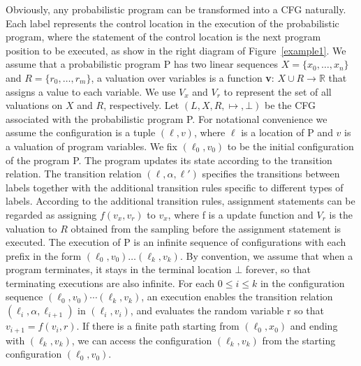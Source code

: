 \documentclass[runningheads]{llncs}
\newcommand\yx[1]{{\color{red} [YD: #1]}}
\begin{document}
Obviously, any probabilistic program can be transformed into a CFG naturally. Each label represents the control location in the execution of the probabilistic program, where the statement of the control location is the next program position to be executed, as show in the right diagram of Figure~\ref{example1}. 
We assume that a probabilistic program P has two linear sequences $X=\{x_0,\dots,x_{n}\}$ and $R=\{r_0,\dots,r_{m}\}$, a valuation over variables is a function \textbf{v}: $X\cup R \to \mathbb{R}$ that assigns a value to each variable. We use $V_x$ and $V_r$ to represent the set of all valuations on $X$ and $R$, respectively. 
Let $(L,X,R,\mapsto,\bot)$ be the CFG associated with the probabilistic program P. For notational convenience we assume the configuration is a tuple $(\ell, v)$, where $\ell$ is a location of P and $v$ is a valuation of program variables.
We fix $(\ell_0, v_0)$ to be the initial configuration of the program P. The program updates its state according to the transition relation. The transition relation $(\ell,\alpha,\ell')$ specifies the transitions between labels together with the additional transition rules specific to different types of labels.
According to the additional transition rules, assignment statements can be regarded as assigning $f(v_x,v_r)$ to $v_x$, where f is a update function and $V_r$ is the valuation to $R$ obtained from the sampling before the assignment statement is executed.
The execution of P is an infinite
sequence of configurations with each prefix in the form $(\ell_0, v_0) \dots (\ell_k, v_k)$. By convention, we assume that when a program terminates, it stays in the terminal location $\bot$ forever, so that terminating executions are also infinite. %
For each $0\leq i\leq k$ in the configuration sequence $(\ell_0,v_0) \cdots (\ell_k, v_k)$, an execution enables the transition relation $(\ell_i, \alpha, \ell_{i+1})$ in $(\ell_i, v_i)$, and evaluates the random variable r so that $v_{i+1}=f(v_i,r)$. If there is a finite path starting from $(\ell_0, x_0)$ and ending with $(\ell_k, v_k)$, we can access the configuration $(\ell_k, v_k)$ from the starting configuration $(\ell_0, v_0)$. 
\end{document}
